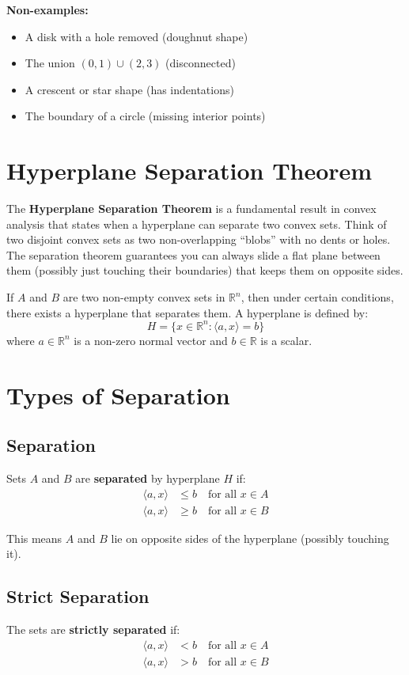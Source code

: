 \documentclass{tufte-handout}
\begin{document}
\textbf{Non-examples:}
\begin{itemize}
    \item A disk with a hole removed (doughnut shape)
    \item The union $(0, 1) \cup (2, 3)$ (disconnected)
    \item A crescent or star shape (has indentations)
    \item The boundary of a circle (missing interior points)
\end{itemize}

\section{Hyperplane Separation Theorem}

The \textbf{Hyperplane Separation Theorem} is a fundamental result in convex analysis that states when a hyperplane can separate two convex sets. Think of two disjoint convex sets as two non-overlapping ``blobs'' with no dents or holes. The separation theorem guarantees you can always slide a flat plane between them (possibly just touching their boundaries) that keeps them on opposite sides.

If $A$ and $B$ are two non-empty convex sets in $\mathbb{R}^n$, then under certain conditions, there exists a hyperplane that separates them. A hyperplane is defined by:
\[
H = \{x \in \mathbb{R}^n : \langle a, x \rangle = b\}
\]
where $a \in \mathbb{R}^n$ is a non-zero normal vector and $b \in \mathbb{R}$ is a scalar.

\section{Types of Separation}

\subsection{Separation}
Sets $A$ and $B$ are \textbf{separated} by hyperplane $H$ if:
\begin{align}
\langle a, x \rangle &\leq b \quad \text{for all } x \in A \\
\langle a, x \rangle &\geq b \quad \text{for all } x \in B
\end{align}

This means $A$ and $B$ lie on opposite sides of the hyperplane (possibly touching it).

\subsection{Strict Separation}
The sets are \textbf{strictly separated} if:
\begin{align}
\langle a, x \rangle &< b \quad \text{for all } x \in A \\
\langle a, x \rangle &> b \quad \text{for all } x \in B
\end{align}
\end{document}
